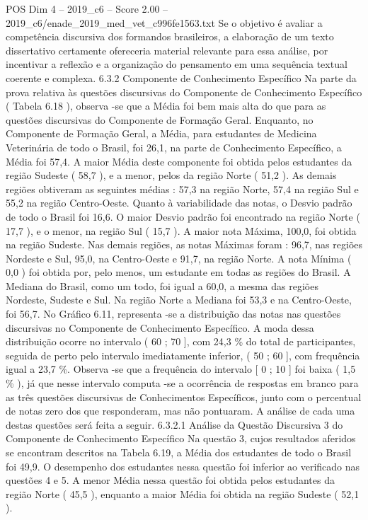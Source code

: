 \begin{textsample}{POS Dim 4 – 2019\_c6 – Score 2.00 – 2019\_c6/enade\_2019\_med\_vet\_c996fe1563.txt}
Se o objetivo é avaliar a competência discursiva dos formandos brasileiros, a elaboração de um texto dissertativo certamente ofereceria material relevante para essa análise, por incentivar a reflexão e a organização do pensamento em uma sequência textual coerente e complexa. 6.3.2 Componente de Conhecimento Específico Na parte da prova relativa às questões discursivas do Componente de Conhecimento Específico ( Tabela 6.18 ), observa -se que a Média foi bem mais alta do que para as questões discursivas do Componente de Formação Geral.
Enquanto, no Componente de Formação Geral, a Média, para estudantes de Medicina Veterinária de todo o Brasil, foi 26,1, na parte de Conhecimento Específico, a Média foi 57,4.
A maior Média deste componente foi obtida pelos estudantes da região Sudeste ( 58,7 ), e a menor, pelos da região Norte ( 51,2 ).
As demais regiões obtiveram as seguintes médias : 57,3 na região Norte, 57,4 na região Sul e 55,2 na região Centro-Oeste.
Quanto à variabilidade das notas, o Desvio padrão de todo o Brasil foi 16,6.
O maior Desvio padrão foi encontrado na região Norte ( 17,7 ), e o menor, na região Sul ( 15,7 ).
A maior nota Máxima, 100,0, foi obtida na região Sudeste.
Nas demais regiões, as notas Máximas foram : 96,7, nas regiões Nordeste e Sul, 95,0, na Centro-Oeste e 91,7, na região Norte.
A nota Mínima ( 0,0 ) foi obtida por, pelo menos, um estudante em todas as regiões do Brasil.
A Mediana do Brasil, como um todo, foi igual a 60,0, a mesma das regiões Nordeste, Sudeste e Sul.
Na região Norte a Mediana foi 53,3 e na Centro-Oeste, foi 56,7.
No Gráfico 6.11, representa -se a distribuição das notas nas questões discursivas no Componente de Conhecimento Específico.
A moda dessa distribuição ocorre no intervalo ( 60 ; 70 ], com 24,3 \% do total de participantes, seguida de perto pelo intervalo imediatamente inferior, ( 50 ; 60 ], com frequência igual a 23,7 \%.
Observa -se que a frequência do intervalo [ 0 ; 10 ] foi baixa ( 1,5 \% ), já que nesse intervalo computa -se a ocorrência de respostas em branco para as três questões discursivas de Conhecimentos Específicos, junto com o percentual de notas zero dos que responderam, mas não pontuaram.
A análise de cada uma destas questões será feita a seguir. 6.3.2.1 Análise da Questão Discursiva 3 do Componente de Conhecimento Específico Na questão 3, cujos resultados aferidos se encontram descritos na Tabela 6.19, a Média dos estudantes de todo o Brasil foi 49,9.
O desempenho dos estudantes nessa questão foi inferior ao verificado nas questões 4 e 5.
A menor Média nessa questão foi obtida pelos estudantes da região Norte ( 45,5 ), enquanto a maior Média foi obtida na região Sudeste ( 52,1 ).

\end{textsample}
